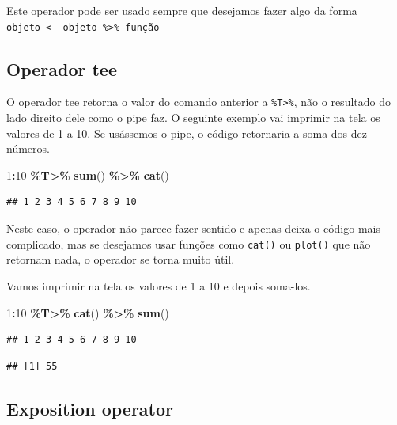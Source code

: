 \documentclass[
]{book}
\newenvironment{Shaded}{\begin{snugshade}}{\end{snugshade}}
\newcommand{\DecValTok}[1]{\textcolor[rgb]{0.00,0.00,0.81}{#1}}
\newcommand{\KeywordTok}[1]{\textcolor[rgb]{0.13,0.29,0.53}{\textbf{#1}}}
\newcommand{\NormalTok}[1]{#1}
\newcommand{\OperatorTok}[1]{\textcolor[rgb]{0.81,0.36,0.00}{\textbf{#1}}}
\newcommand{\StringTok}[1]{\textcolor[rgb]{0.31,0.60,0.02}{#1}}
\begin{document}
Este operador pode ser usado sempre que desejamos fazer algo da forma \texttt{objeto\ \textless{}-\ objeto\ \%\textgreater{}\%\ função}

\hypertarget{operador-tee}{%
\subsection{Operador tee}\label{operador-tee}}

O operador tee retorna o valor do comando anterior a \texttt{\%T\textgreater{}\%}, não o resultado do lado direito dele como o pipe faz. O seguinte exemplo vai imprimir na tela os valores de 1 a 10. Se usássemos o pipe, o código retornaria a soma dos dez números.

\begin{Shaded}
\begin{Highlighting}[]
\DecValTok{1}\OperatorTok{:}\DecValTok{10} \OperatorTok{\%T>\%}\StringTok{ }\KeywordTok{sum}\NormalTok{() }\OperatorTok{\%>\%}\StringTok{ }\KeywordTok{cat}\NormalTok{()}
\end{Highlighting}
\end{Shaded}

\begin{verbatim}
## 1 2 3 4 5 6 7 8 9 10
\end{verbatim}

Neste caso, o operador não parece fazer sentido e apenas deixa o código mais complicado, mas se desejamos usar funções como \texttt{cat()} ou \texttt{plot()} que não retornam nada, o operador se torna muito útil.

Vamos imprimir na tela os valores de 1 a 10 e depois soma-los.

\begin{Shaded}
\begin{Highlighting}[]
\DecValTok{1}\OperatorTok{:}\DecValTok{10}  \OperatorTok{\%T>\%}\StringTok{ }\KeywordTok{cat}\NormalTok{() }\OperatorTok{\%>\%}\StringTok{ }\KeywordTok{sum}\NormalTok{()}
\end{Highlighting}
\end{Shaded}

\begin{verbatim}
## 1 2 3 4 5 6 7 8 9 10
\end{verbatim}

\begin{verbatim}
## [1] 55
\end{verbatim}

\hypertarget{exposition-operator}{%
\subsection{Exposition operator}\label{exposition-operator}}
\end{document}
